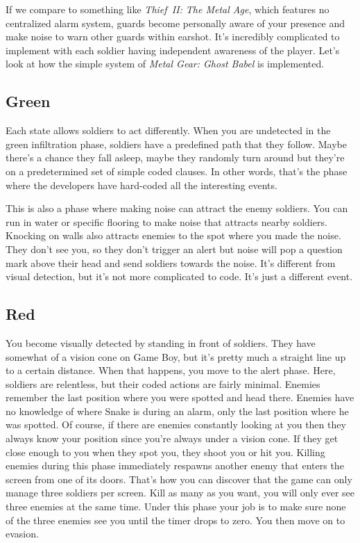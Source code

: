 \documentclass{book}
\begin{document}
If we compare to something like \emph{Thief II: The Metal Age}, which features no centralized alarm system, guards become personally aware of your presence and make noise to warn other guards within earshot. It’s incredibly complicated to implement with each soldier having independent awareness of the player. Let’s look at how the simple system of \emph{Metal Gear: Ghost Babel} is implemented.

\subsection*{Green}\nopagebreak[4]

Each state allows soldiers to act differently. When you are undetected in the green infiltration phase, soldiers have a predefined path that they follow. Maybe there’s a chance they fall asleep, maybe they randomly turn around but they’re on a predetermined set of simple coded clauses. In other words, that’s the phase where the developers have hard-coded all the interesting events.

This is also a phase where making noise can attract the enemy soldiers. You can run in water or specific flooring to make noise that attracts nearby soldiers. Knocking on walls also attracts enemies to the spot where you made the noise. They don’t see you, so they don’t trigger an alert but noise will pop a question mark above their head and send soldiers towards the noise. It’s different from visual detection, but it’s not more complicated to code. It’s just a different event.

\subsection*{Red}\nopagebreak[4]

You become visually detected by standing in front of soldiers. They have somewhat of a vision cone on Game Boy, but it’s pretty much a straight line up to a certain distance. When that happens, you move to the alert phase. Here, soldiers are relentless, but their coded actions are fairly minimal. Enemies remember the last position where you were spotted and head there. Enemies have no knowledge of where Snake is during an alarm, only the last position where he was spotted. Of course, if there are enemies constantly looking at you then they always know your position since you’re always under a vision cone. If they get close enough to you when they spot you, they shoot you or hit you. Killing enemies during this phase immediately respawns another enemy that enters the screen from one of its doors. That’s how you can discover that the game can only manage three soldiers per screen. Kill as many as you want, you will only ever see three enemies at the same time. Under this phase your job is to make sure none of the three enemies see you until the timer drops to zero. You then move on to evasion.
\end{document}
